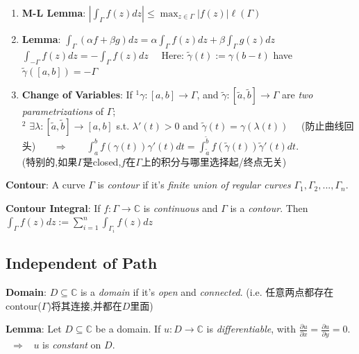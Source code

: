 \documentclass[9pt]{article}
\begin{document}
\begin{enumerate}[itemsep=-2pt, topsep=-2pt]
    \item \textbf{M-L Lemma}: $|\int_{\Gamma}f(z)dz|\leq \max_{z\in\Gamma}|f(z)|\ell(\Gamma)$
    \item \textbf{Lemma}: $\int_{\Gamma}(\alpha f+\beta g)dz=\alpha\int_{\Gamma}f(z)dz+\beta\int_{\Gamma}g(z)dz$ \qquad $\int_{-\Gamma}f(z)dz=-\int_{\Gamma}f(z)dz$ \ \ {\scriptsize Here: $\widetilde{\gamma}(t):=\gamma(b-t)$ have $\widetilde{\gamma}([a,b])=-\Gamma$}
    \item \textbf{Change of Variables}: {\small If $^1\gamma:[a,b]\to\Gamma$, and $\widetilde{\gamma}:[\widetilde{a},\widetilde{b}]\to\Gamma$ are \textit{two parametrizations} of $\Gamma$;} \\
    {\small $^2$ $\exists\lambda:[\widetilde{a},\widetilde{b}]\to[a,b]$ s.t. $\lambda'(t)>0$ and $\widetilde{\gamma}(t)=\gamma(\lambda(t))$ \ \ {\scriptsize (防止曲线回头)} \ \ \ $\Rightarrow$ \ \ \ $\int^b_a f(\gamma(t))\gamma'(t)dt=\int^{\widetilde{b}}_{\widetilde{a}}f(\widetilde{\gamma}(t))\widetilde{\gamma}'(t)dt$}. \\
    {\small (特别的,如果$\Gamma$是closed,$f$在$\Gamma$上的积分与哪里选择起/终点无关)}
\end{enumerate}

\textbf{Contour}: A curve $\Gamma$ is \textit{contour} if it's \textit{finite union of regular curves} $\Gamma_1,\Gamma_2,...,\Gamma_n$. \quad {}

\quad \textbf{Contour Integral}: If $f:\Gamma\to\mathbb{C}$ is \textit{continuous} and $\Gamma$ is a \textit{contour}. Then $\int_{\Gamma}f(z)dz:=\sum^n_{i=1}\int_{\Gamma_i}f(z)dz$


\subsection{Independent of Path} %

\textbf{Domain}: $D\subseteq\mathbb{C}$ is a \textit{domain} if it's \textit{open} and \textit{connected}. {\small (i.e. 任意两点都存在contour($\Gamma$)将其连接,并都在$D$里面)}

\textbf{Lemma}: Let $D\subseteq\mathbb{C}$ be a domain. If $u:D\to\mathbb{C}$ is \textit{differentiable}, with $\frac{\partial u}{\partial x}=\frac{\partial u}{\partial y}=0$. \ $\Rightarrow$ \ $u$ is \textit{constant} on $D$. \qquad {}
\end{document}
